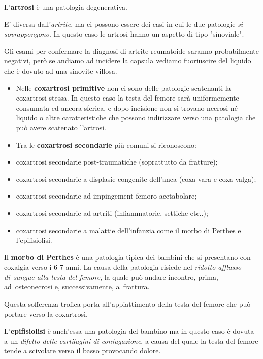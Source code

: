 \documentclass[]{article}
\begin{document}
L'\textbf{artrosi} è una patologia degenerativa.

E' diversa dall'\emph{artrite}, ma ci possono essere dei casi in cui le
due patologie \emph{si sovrappongono}. In questo caso le artrosi hanno
un aspetto di tipo "sinoviale".

Gli esami per confermare la diagnosi di artrite reumatoide saranno
probabilmente negativi, però se andiamo ad incidere la capsula vediamo
fuoriuscire del liquido che è dovuto ad una sinovite villosa.

\begin{itemize}
\item
  Nelle \textbf{coxartrosi primitive} non ci sono delle patologie
  scatenanti la coxartrosi stessa. In questo caso la testa del femore
  sarà uniformemente consumata ed ancora sferica, e dopo incisione non
  si trovano necrosi né liquido o altre caratteristiche che possono
  indirizzare verso una patologia che può avere scatenato l'artrosi.
\item
  Tra le \textbf{coxartrosi secondarie} più comuni si riconoscono:
\end{itemize}

\begin{itemize}
\item
  coxartrosi secondarie post-traumatiche (soprattutto da fratture);
\item
  coxartrosi secondarie a displasie congenite dell'anca (coxa vara e
  coxa valga);
\item
  coxartrosi secondarie ad impingement femoro-acetabolare;
\item
  coxartrosi secondarie ad artriti (infiammatorie, settiche etc..);
\item
  coxartrosi secondarie a malattie dell'infanzia come il morbo di
  Perthes e l'epifisiolisi.
\end{itemize}

Il \textbf{morbo di Perthes} è una patologia tipica dei bambini che si
presentano con coxalgia verso i 6-7 anni. La causa della patologia
risiede nel \emph{ridotto afflusso di~sangue alla testa del femore}, la
quale può andare incontro, prima, ad~osteonecrosi e, successivamente,
a~frattura.

Questa sofferenza trofica porta all'appiattimento della testa del femore
che può portare verso la coxartrosi.

L'\textbf{epifisiolisi} è anch'essa una patologia del bambino ma in
questo caso è dovuta a un \emph{difetto delle cartilagini di
coniugazione}, a causa del quale la testa del femore tende a scivolare
verso il basso provocando dolore.
\end{document}
